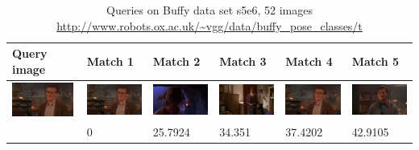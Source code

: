 \documentclass[10pt,a4paper]{article}
\begin{document}
\begin{table}
    \caption{Queries on Buffy data set s5e6, 52 images \url{http://www.robots.ox.ac.uk/~vgg/data/buffy_pose_classes/t}}
    \begin{tabular}{|l|l|l|l|l|l|}
        \hline
        Query image & Match 1 & Match 2 & Match 3 & Match 4 & Match 5 \\ \hline

        \includegraphics[width=20mm]{queries/015663.jpg} &	
	\includegraphics[width=20mm]{queries/015663.jpg} &	
	\includegraphics[width=20mm]{queries/019018.jpg}  &
	\includegraphics[width=20mm]{queries/012194.jpg}  &
	\includegraphics[width=20mm]{queries/015742.jpg} &
	\includegraphics[width=20mm]{queries/022108.jpg} \\ 
	~ & 0 & 25.7924 & 34.351 &  37.4202 & 42.9105 \\ \hline


\end{tabular}
\end{table}
\end{document}
